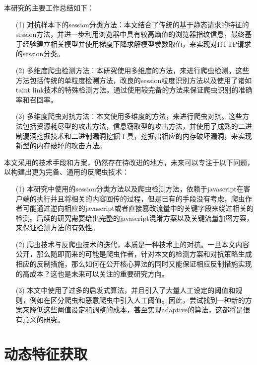\documentclass[doctor,privacy,twoside]{buaa_mac}
\begin{document}
本研究的主要工作总结如下：
\begin{itemize}
\item[(1)] 对抗样本下的session分类方法：本文结合了传统的基于静态请求的特征的session方法，并进一步利用浏览器中具有较高熵值的浏览器指纹信息，最终基于经验建立相关模型并使用梯度下降求解模型参数取值，来实现对HTTP请求的session分类。

\item[(2)] 多维度爬虫检测方法：本研究使用多维度的方法，来进行爬虫检测。这些方法包括传统的单粒度检测方法，改良的session粒度识别方法以及使用了诸如taint link技术的特殊检测方法。通过使用较完备的方法来保证爬虫识别的准确率和召回率。

\item[(3)] 多维度爬虫对抗方法：本文使用多维度的方法，来进行爬虫对抗。这些方法包括资源耗尽型的攻击方法，信息窃取型的攻击方法，并使用了成熟的二进制漏洞挖掘技术和二进制漏洞挖掘工具，挖掘出相应的内存破坏漏洞，来实现新型的内存破坏的攻击方法。
\end{itemize}

本文采用的技术手段和方案，仍然存在待改进的地方，未来可以专注于以下问题，以构建出更为完备、通用的反爬虫技术：

\begin{itemize}
\item[(1)] 本研究中使用的session分类方法以及爬虫检测方法，依赖于javascript在客户端的执行并且将相关的内容回传的过程，但是已有的手段没有考虑，爬虫作者可能通过逆向相应的javascript或者直接篡改流量中的关键字段来绕过相关的检测。后续的研究需要给出完整的javascript混淆方案以及关键流量加密方案，来保证检测方法的有效性。

\item[(2)]  爬虫技术与反爬虫技术的迭代，本质是一种技术上的对抗。一旦本文内容公开，那么随即而来的可能是爬虫作者，针对本文的检测方案和对抗策略生成相应的反制措施，那么如何在公开核心算法的同时又能保证相应反制措施实现的高成本？这也是未来可以关注的重要研究方向。

\item[(3)] 本文中使用了过多的启发式算法，并且引入了大量人工设定的阈值和规则，例如在区分爬虫和恶意爬虫中引入人工阈值。因此，尝试找到一种新的方案来降低这些阈值设定和调整的成本，甚至实现adaptive的算法，这都将是很有意义的研究。

\end{itemize}




\appendix

\section{动态特征获取}
\end{document}
